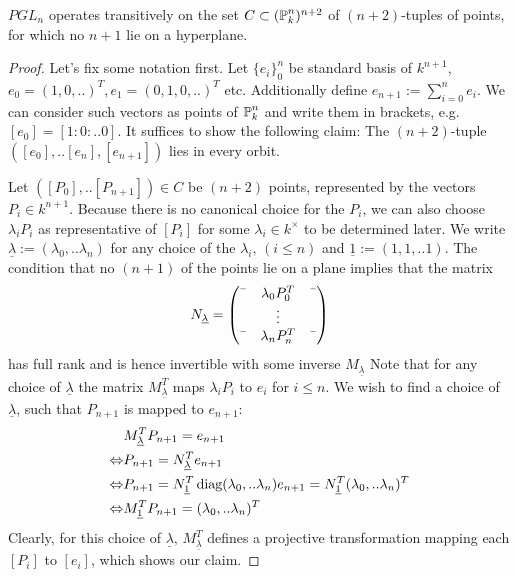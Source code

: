 \begin{theorem}
$PGL_n$ operates transitively on the set $C \subset (\operatorname{\mathbb P}^n_k)^{n+2}$ of $(n+2)$-tuples of points, for which no $n+1$ lie on a hyperplane.
\end{theorem}
\begin{proof}
Let's fix some notation first. Let $\{ e_i \}_0^n$ be standard basis of $k^{n+1}$, $e_0 = (1,0,..)^T, e_1 = (0,1,0,..)^T$ etc.
Additionally define $e_{n+1} := \sum_{i=0}^n e_i$.
We can consider such vectors as points of $\operatorname{\mathbb P}^n_k$ and write them in brackets, e.g. $[e_0] = [1:0:..0]$.
It suffices to show the following claim: The $(n+2)$-tuple $([e_0],..[e_n],[e_{n+1}])$ lies in every orbit.

Let $([P_0],..[P_{n+1}]) \in C$ be $(n+2)$ points, represented by the vectors $P_i \in k^{n+1}$.
Because there is no canonical choice for the $P_i$, we can also choose $\lambda_i P_i$ as representative of $[P_i]$ for some $\lambda_i \in k^\times$ to be determined later.
We write $\underline \lambda  := (\lambda_0,..\lambda_n)$ for any choice of the $\lambda_i,\,(i\leq n)$ and $\underline 1 := (1,1,..1)$.
The condition that no $(n+1)$ of the points lie on a plane implies that the matrix
\begin{equation}
N_{\underline\lambda}
=
\begin{pmatrix}
\textemdash & \lambda_0 P_0^T & \textemdash \\
& \vdots &  \\
\textemdash & \lambda_n P_n^T & \textemdash \\
\end{pmatrix}
\end{equation}
has full rank and is hence invertible with some inverse $M_{\underline\lambda}$
Note that for any choice of $\underline\lambda$ the matrix $M_{\underline\lambda}^T$ maps $\lambda_iP_i$ to $e_i$ for $i \leq  n$.
We wish to find a choice of $\underline\lambda$, such that $P_{n+1}$ is mapped to $e_{n+1}$:
\begin{align}
& M_{\underline\lambda}^TP_{n+1} = e_{n+1} \\
\Leftrightarrow & P_{n+1} = N_{\underline\lambda}^T e_{n+1} \\
\Leftrightarrow & P_{n+1} = N_{\underline 1}^T \operatorname{\text{diag}}(\lambda_0,..\lambda_n) e_{n+1}
                          = N_{\underline 1}^T (\lambda_0,..\lambda_n)^T \\
\Leftrightarrow & M_{\underline 1}^T P_{n+1} = (\lambda_0,..\lambda_n)^T
\end{align}
Clearly, for this choice of $\underline\lambda$, $M_{\underline \lambda}^T$ defines a projective transformation mapping each $[P_i]$ to $[e_i]$, which shows our claim.

\end{proof}


